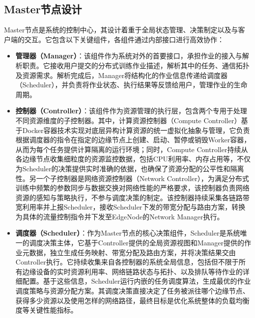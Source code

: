 \subsection{Master节点设计}
Master节点是系统的控制中心，其设计着重于全局状态管理、决策制定以及与客户端的交互。它包含以下关键组件，各组件通过内部接口进行高效协作：
\begin{itemize}
\item \textbf{管理器（Manager）}：该组件作为系统对外的首要接口，承担作业的接入与解析职责。它接收用户提交的分布式训练作业描述，解析其中的任务、通信拓扑及资源需求。解析完成后，Manager将结构化的作业信息传递给调度器（Scheduler），并负责将作业状态、执行结果等反馈给用户，管理作业的生命周期。

\item \textbf{控制器（Controller）}：该组件作为资源管理的执行层，包含两个专用于处理不同资源维度的子控制器。其中，计算资源控制器（Compute Controller）基于Docker容器技术实现对底层异构计算资源的统一虚拟化抽象与管理，它负责根据调度器的指令在指定的边缘节点上创建、启动、暂停或销毁Worker容器，从而为每个任务提供计算隔离的运行环境；同时，Compute Controller持续从各边缘节点收集细粒度的资源监控数据，包括CPU利用率、内存占用等，不仅为Scheduler的决策提供实时准确的依据，也确保了资源分配的公平性和隔离性。另一个子控制器是网络资源控制器（Network Controller），为满足分布式训练中频繁的参数同步与数据交换对网络性能的严格要求，该控制器负责网络资源的感知与策略执行，不参与调度决策的制定。该控制器持续采集各链路带宽利用率并上报Scheduler，接收Scheduler下发的带宽分配与路由方案，转换为具体的流量控制指令并下发至EdgeNode的Network Manager执行。

\item \textbf{调度器（Scheduler）}：作为Master节点的核心决策组件，Scheduler是系统唯一的调度决策主体，它基于Controller提供的全局资源视图和Manager提供的作业元数据，独立生成任务映射、带宽分配及路由方案，并将决策结果交由Controller执行。它持续收集来自各控制器的系统全局信息，包括但不限于所有边缘设备的实时资源利用率、网络链路状态与拓扑、以及排队等待作业的详细配置。基于这些信息，Scheduler运行内嵌的任务调度算法，生成最优的作业调度策略与资源分配方案。其调度决策直接决定了任务被派往哪个边缘节点、获得多少资源以及使用怎样的网络路径，最终目标是优化系统整体的负载均衡度等关键性能指标。
\end{itemize}

